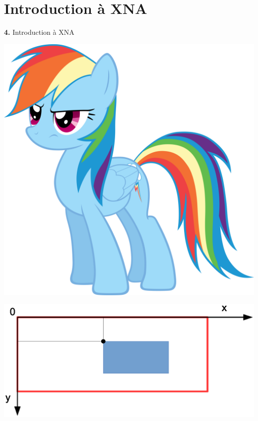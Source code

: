 \documentclass[12pt]{beamer}
\begin{document}
\section{Introduction à XNA}

\begin{frame}
    \begin{center}
        \vspace{1cm}

        {\Large \textbf{4.} Introduction à XNA} \\

        \vspace{0.5cm}

        \includegraphics[scale=0.65]{img/rd.png}
    \end{center}
\end{frame}

\begin{frame}
    \vspace{1cm}
    \begin{center}
        \includegraphics[scale=0.44]{img/xna-axis.eps}
    \end{center}
\end{frame}
\end{document}
